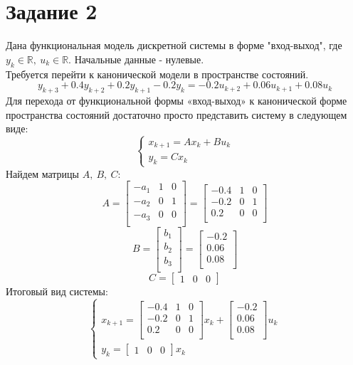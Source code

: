 \documentclass[12pt]{article}
\begin{document}
\section*{Задание 2}
Дана функциональная модель дискретной системы в форме "вход-выход", где $y_k \in \mathbb{R}, \ u_k \in \mathbb{R}$. Начальные данные - нулевые. \\
Требуется перейти к канонической модели в пространстве состояний.
\[
y_{k+3} + 0.4 y_{k+2} + 0.2 y_{k+1} - 0.2 y_{k} = −0.2 u_{k+2} + 0.06 u_{k+1} + 0.08 u_k
\]
Для перехода от функциональной формы «вход-выход» к канонической форме пространства состояний достаточно просто представить систему в следующем виде: 
\[
\begin{cases}
    x_{k+1} = A x_k + B u_k \\
    y_{k} = C x_k
\end{cases}
\]
Найдем матрицы $A, \ B, \ C$:
\[
    A = \begin{bmatrix}
        -a_1 & 1 & 0 \\
        -a_2 & 0 & 1 \\
        -a_3 & 0 & 0 \\
    \end{bmatrix} = 
    \begin{bmatrix}
        -0.4 & 1 & 0 \\
        -0.2 & 0 & 1 \\
        0.2 & 0 & 0 \\
    \end{bmatrix}
\]
\[
    B = \begin{bmatrix}
        b_1 \\
        b_2 \\
        b_3 \\
    \end{bmatrix} = 
    \begin{bmatrix}
        -0.2 \\
        0.06 \\
        0.08 \\
    \end{bmatrix}
\]
\[
    C = \begin{bmatrix}
        1 & 0 & 0
    \end{bmatrix}
\]
Итоговый вид системы:
\[
    \begin{cases}
        x_{k+1} = \begin{bmatrix}
        -0.4 & 1 & 0 \\
        -0.2 & 0 & 1 \\
        0.2 & 0 & 0 \\
    \end{bmatrix} x_k + \begin{bmatrix}
        -0.2 \\
        0.06 \\
        0.08 \\
    \end{bmatrix} u_k \\
        y_{k} = \begin{bmatrix}
        1 & 0 & 0
    \end{bmatrix} x_k
    \end{cases}
\]
\end{document}
